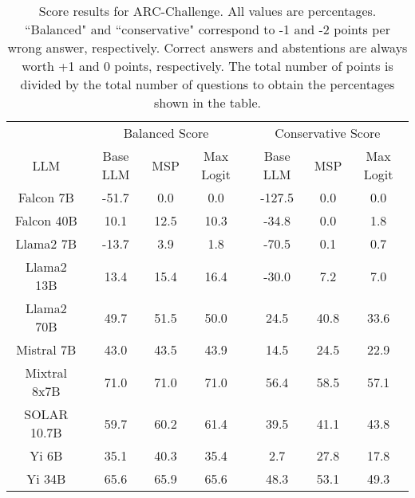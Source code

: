 \begin{table*}
\centering
\begin{tabular}{c|c|c|c|c|c|c}
& \multicolumn{3}{c|}{Balanced Score} & \multicolumn{3}{c}{Conservative Score} \\ 
LLM & Base LLM & MSP & Max Logit & Base LLM & MSP & Max Logit\\ \hline
Falcon 7B & -51.7 & 0.0 & 0.0 & -127.5 & 0.0 & 0.0\\
Falcon 40B & 10.1 & 12.5 & 10.3 & -34.8 & 0.0 & 1.8\\
Llama2 7B & -13.7 & 3.9 & 1.8 & -70.5 & 0.1 & 0.7\\
Llama2 13B & 13.4 & 15.4 & 16.4 & -30.0 & 7.2 & 7.0\\
Llama2 70B & 49.7 & 51.5 & 50.0 & 24.5 & 40.8 & 33.6\\
Mistral 7B & 43.0 & 43.5 & 43.9 & 14.5 & 24.5 & 22.9\\
Mixtral 8x7B & 71.0 & 71.0 & 71.0 & 56.4 & 58.5 & 57.1\\
SOLAR 10.7B & 59.7 & 60.2 & 61.4 & 39.5 & 41.1 & 43.8\\
Yi 6B & 35.1 & 40.3 & 35.4 & 2.7 & 27.8 & 17.8\\
Yi 34B & 65.6 & 65.9 & 65.6 & 48.3 & 53.1 & 49.3\\
\hline
\end{tabular}
\caption{Score results for ARC-Challenge. All values are percentages. ``Balanced" and ``conservative" correspond to -1 and -2 points per wrong answer, respectively. Correct answers and abstentions are always worth +1 and 0 points, respectively. The total number of points is divided by the total number of questions to obtain the percentages shown in the table.}
\label{tab:arc_score}
\end{table*}
